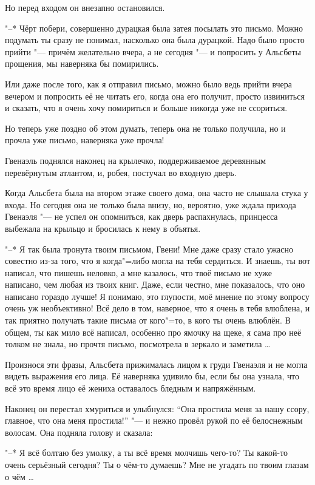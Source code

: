 Но перед входом он внезапно остановился.

"--* Чёрт побери, совершенно дурацкая была затея посылать это письмо.
Можно подумать ты сразу не понимал, насколько она была дурацкой.
Надо было просто прийти "--- причём желательно вчера, а не сегодня "--- и
попросить у Альсбеты прощения, мы наверняка бы помирились.

Или даже после того, как я отправил письмо, можно было ведь прийти вчера вечером
и попросить её не читать его, когда она его получит, просто извиниться и
сказать, что я очень хочу помириться и больше никогда уже не ссориться.

Но теперь уже поздно об этом думать, теперь она не только получила, но и прочла
уже письмо, наверняка уже прочла!

Гвенаэль поднялся наконец на крылечко, поддерживаемое деревянным перевёрнутым
атлантом, и, робея, постучал во входную дверь.

Когда Альсбета была на втором этаже своего дома, она часто не слышала стука у
входа.
Но сегодня она не только была внизу, но, вероятно, уже ждала прихода Гвенаэля
"--- не успел он опомниться, как дверь распахнулась, принцесса выбежала на
крыльцо и бросилась к нему в объятья.

"--* Я так была тронута твоим письмом, Гвени!
Мне даже сразу стало ужасно совестно из-за того, что я когда"=либо могла на тебя
сердиться.
И знаешь, ты вот написал, что пишешь неловко, а мне казалось, что твоё письмо не
хуже написано, чем любая из твоих книг.
Даже, если честно, мне показалось, что оно написано гораздо лучше!
Я понимаю, это глупости, моё мнение по этому вопросу очень уж необъективно!
Всё дело в том, наверное, что я очень в тебя влюблена, и так приятно получать
такие письма от кого"=то, в кого ты очень влюблён.
В общем, ты как мило всё написал, особенно про ямочку на щеке, я сама про неё
толком не знала, но прочтя письмо, посмотрела в зеркало и заметила \ldots

Произнося эти фразы, Альсбета прижималась лицом к груди Гвенаэля и не могла
видеть выражения его лица.
Её наверняка удивило бы, если бы она узнала, что всё это время лицо её жениха
оставалось бледным и напряжённым.

Наконец он перестал хмуриться и улыбнулся: \enquote{Она простила меня за нашу
ссору, главное, что она меня простила!} "--- и нежно провёл рукой по её
белоснежным волосам.
Она подняла голову и сказала:

"--* Я всё болтаю без умолку, а ты всё время молчишь чего-то?
Ты какой-то очень серьёзный сегодня?
Ты о чём-то думаешь?
Мне не угадать по твоим глазам о чём \ldots

